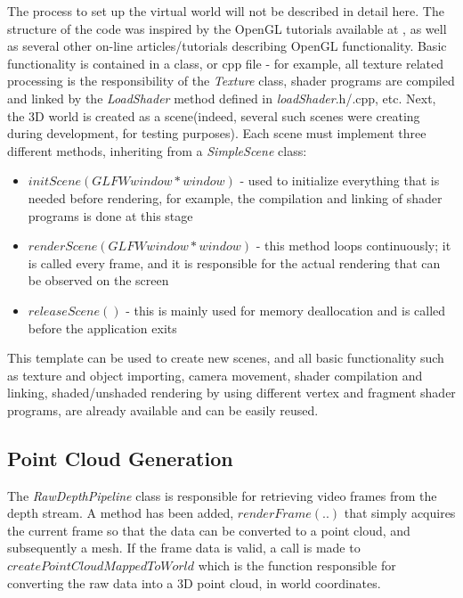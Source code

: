 \documentclass[]{article}
\begin{document}
The process to set up the virtual world will not be described in detail here. The structure of the code was inspired by the OpenGL tutorials available at \cite{OpenGLTuts}, as well as several other on-line articles/tutorials describing OpenGL functionality. Basic functionality is contained in a class, or cpp file - for example, all texture related processing is the responsibility of the \textit{Texture} class, shader programs are compiled and linked by the \textit{LoadShader} method defined in \textit{loadShader}.h/.cpp, etc. Next, the 3D world is created as a scene(indeed, several such scenes were creating during development, for testing purposes). Each scene must implement three different methods, inheriting from a \textit{SimpleScene} class:
\begin{itemize}
\item $initScene(GLFWwindow *window)$ - used to initialize everything that is needed before rendering, for example, the compilation and linking of shader programs is done at this stage
\item $renderScene(GLFWwindow *window)$ - this method loops continuously; it is called every frame, and it is responsible for the actual rendering that can be observed on the screen
\item $releaseScene()$ - this is mainly used for memory deallocation and is called before the application exits
\end{itemize}

This template can be used to create new scenes, and all basic functionality such as texture and object importing, camera movement, shader compilation and linking, shaded/unshaded rendering by using different vertex and fragment shader programs, are already available and can be easily reused.

\subsection{Point Cloud Generation}

The \textit{RawDepthPipeline} class is responsible for retrieving video frames from the depth stream. A method has been added, $renderFrame(..)$ that simply acquires the current frame so that the data can be converted to a point cloud, and subsequently a mesh. If the frame data is valid, a call is made to $createPointCloudMappedToWorld$ which is the function responsible for converting the raw data into a 3D point cloud, in world coordinates.
\end{document}
